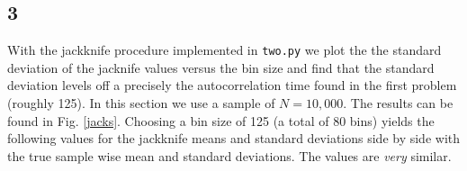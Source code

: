 \documentclass[singlepage,notitlepage,nofootinbib,11pt]{revtex4-1}
\begin{document}
\subsection{3}
With the jackknife procedure implemented in \verb|two.py| we plot the the standard deviation of the jacknife values versus the bin size and find that the standard deviation levels off a precisely the autocorrelation time found in the first problem (roughly 125). In this section we use a sample of $N=10,000$. The results can be found in Fig. \ref{jacks}. Choosing a bin size of 125 (a total of 80 bins) yields the following values for the jackknife means and standard deviations side by side with the true sample wise mean and standard deviations. The values are {\it very} similar.
\begin{center}
\end{center}
\end{document}
